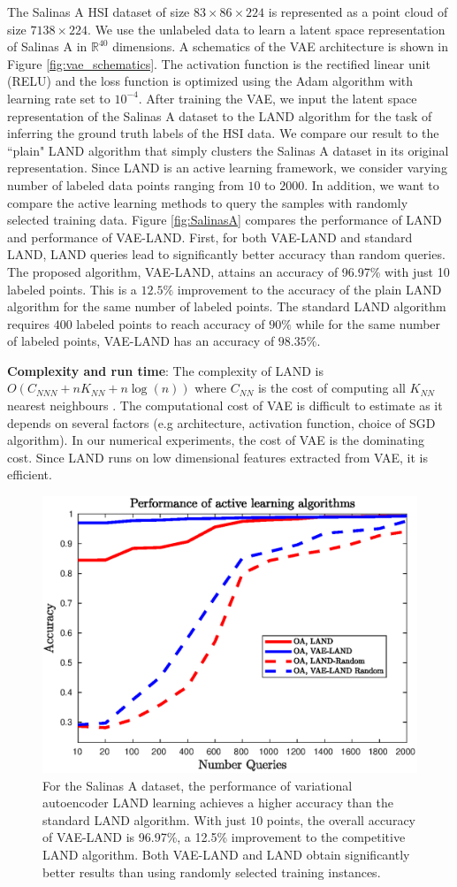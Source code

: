 \documentclass{article}
\def\R{\mathbb{R}}
\def\R{{\mathbb R}}
\begin{document}
The Salinas A HSI dataset of size $83 \times 86\times 224$ is represented as a point cloud of size $7138\times 224$. We use the unlabeled data to learn a latent space representation of Salinas A in $\R^{40}$ dimensions. A schematics of the VAE architecture is shown in Figure \ref{fig:vae_schematics}. The activation function is the rectified linear unit (RELU) and the loss function is optimized using the Adam algorithm with learning rate set to $10^{-4}$. After training the VAE, we input the latent space representation of the Salinas A dataset to the LAND algorithm for the task of inferring the ground truth labels of the HSI data. We compare our result to the ``plain" LAND algorithm that simply clusters the Salinas A dataset in its original representation. Since LAND is an active learning framework, we consider varying number of labeled data points ranging from $10$ to $2000$. In addition, we want to compare the active learning methods to query the samples with randomly selected training data. Figure \ref{fig:SalinasA} compares the performance of LAND and performance of VAE-LAND. First, for both VAE-LAND and standard LAND, LAND queries lead to significantly better accuracy than random queries. The proposed algorithm, VAE-LAND, attains an accuracy of 96.97\% with just 10 labeled points. This is a $12.5\%$ improvement to the accuracy of the plain LAND algorithm for the same number of labeled points. The standard LAND algorithm requires $400$ labeled points to reach accuracy of $90\%$ while for the same number of labeled points, VAE-LAND has an accuracy of $98.35\%$. 

\noindent \textbf{Complexity and run time}: The complexity of LAND is $O(C_{NNN}+nK_{NN}+n\log(n))$ where $C_{NN}$ is the cost of computing all $K_{NN}$ nearest neighbours \cite{Maggioni2019_LAND}. 
The computational cost of VAE is difficult to estimate as it depends on several factors (e.g architecture, activation function, choice of SGD algorithm). In our numerical experiments, the cost of VAE is the dominating cost. Since LAND runs on low dimensional features extracted from VAE, it is efficient. 

\begin{figure}
    \includegraphics[width=.45\textwidth]{Images/salinasa_results_improved.eps}
    \caption{For the Salinas A dataset, the performance of variational autoencoder LAND learning achieves a higher accuracy than the standard LAND algorithm. With just $10$ points, the overall accuracy of VAE-LAND is 96.97\%, a 12.5\% improvement to the competitive LAND algorithm. Both VAE-LAND and LAND obtain significantly better results than using randomly selected training instances. }
    \label{fig:my_label}
\end{figure}
\end{document}
